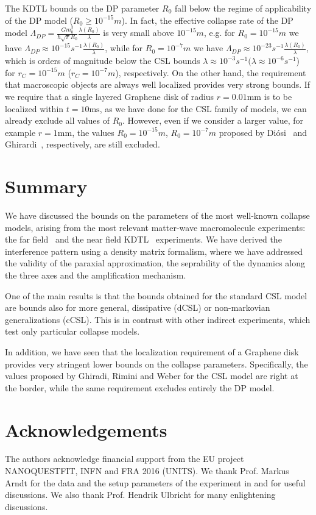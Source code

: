 \documentclass[12pt,groupedaddress,pra,aps]{revtex4-1}
\begin{document}
The KDTL bounds on the DP parameter $R_0$ fall below the regime of applicability of the DP model ($R_0\geq10^{-15}m$). In fact, the effective collapse rate of the DP model $\Lambda_{DP}=\frac{G m_0^2}{\hbar \sqrt{\pi} R_0} \frac{\lambda(R_0)}{\lambda}$ 
is very small above $10^{-15}m$, e.g. for $R_0=10^{-15}m$ we have $\Lambda_{DP} \approx 10^{-15}s^{-1} \frac{\lambda(R_0)}{\lambda}$, 
while for $R_0=10^{-7}m$ we have $\Lambda_{DP} \approx 10^{-23} s^{-1} \frac{\lambda(R_0)}{\lambda}$, which is orders of magnitude below the CSL bounds 
$\lambda \approx 10^{-3}s^{-1} (\lambda \approx 10^{-6} s^{-1}$) for  $r_C=10^{-15}m$ ($r_C=10^{-7}m$), respectively. On the other hand, the requirement  that macroscopic objects are always well localized provides very strong bounds. If we require that a single layered Graphene disk of radius $r=0.01\text{mm}$ is to be localized within $t=10\text{ms}$, as we have done for the CSL family of models, we can already exclude all values of $R_0$. However, even if we consider a larger value, for example $r=1\text{mm}$, the values $R_0=10^{-15}m$, $R_0=10^{-7}m$ proposed by  Di\'{o}si~\cite{Diosi1987377} and Ghirardi~\cite{ghirardi1990continuous}, respectively, are still excluded.



\clearpage
\section{Summary}\label{conclusions}
We have discussed the bounds on the parameters of the most well-known collapse models, arising from the most relevant matter-wave macromolecule experiments: the far field~\cite{Real} and the near field KDTL~\cite{C3CP51500A} experiments. We have derived the interference pattern using a density matrix formalism, where we have addressed the validity of the paraxial approximation, the seprability of the dynamics along the three axes and the amplification mechanism. 

One of the main results is that the bounds obtained for the standard CSL model are bounds also for more general, dissipative (dCSL) or non-markovian generalizations (cCSL). This is in contrast with other indirect experiments, which test only particular collapse models. 

In addition, we have seen that the localization requirement of a Graphene disk provides very stringent lower bounds on the collapse parameters. Specifically, the values proposed by Ghiradi, Rimini and Weber for the CSL model are right at the border, while the same requirement excludes entirely the DP model.

\section*{Acknowledgements}
The authors acknowledge financial support from the EU project NANOQUESTFIT, INFN and FRA 2016 (UNITS). We thank Prof. Markus Arndt for the data and the setup parameters of the experiment in \cite{MSCH} and for useful discussions. We also thank Prof. Hendrik Ulbricht for many enlightening discussions.

\clearpage


\end{document}
